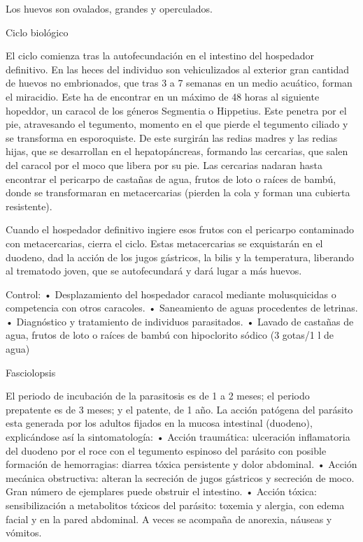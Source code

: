 Los huevos son ovalados, grandes y operculados.

Ciclo biológico

El ciclo comienza tras la autofecundación en el intestino del hospedador definitivo. En las heces del individuo son vehiculizados al exterior gran cantidad de huevos no embrionados, que tras 3 a 7 semanas en un medio acuático, forman el miracidio. Este ha de encontrar en un máximo de 48 horas al siguiente hopeddor, un caracol de los géneros Segmentia o Hippetius. Este penetra por el pie, atravesando el tegumento, momento en el que pierde el tegumento ciliado y se transforma en esporoquiste. De este surgirán las redias madres y las redias hijas, que se desarrollan en el hepatopáncreas, formando las cercarias, que salen del caracol por el moco que libera por su pie. Las cercarias nadaran hasta encontrar el pericarpo de castañas de agua, frutos de loto o raíces de bambú, donde se transformaran en metacercarias (pierden la cola y forman una cubierta resistente).

Cuando el hospedador definitivo ingiere esos frutos con el pericarpo contaminado con metacercarias, cierra el ciclo. Estas metacercarias se exquistarán en el duodeno, dad la acción de los jugos gástricos, la bilis y la temperatura, liberando al trematodo joven, que se autofecundará y dará lugar a más huevos.

Control:
• Desplazamiento del hospedador caracol mediante molusquicidas o competencia con otros caracoles.
• Saneamiento de aguas procedentes de letrinas.
• Diagnóstico y tratamiento de individuos parasitados.
• Lavado de castañas de agua, frutos de loto o raíces de bambú con hipoclorito sódico (3 gotas/1 l de agua)

Fasciolopsis

El periodo de incubación de la parasitosis es de 1 a 2 meses; el periodo prepatente es de 3 meses; y el patente, de 1 año. La acción patógena del parásito esta generada por los adultos fijados en la mucosa intestinal (duodeno), explicándose así la sintomatología:
• Acción traumática: ulceración inflamatoria del duodeno por el roce con el tegumento espinoso del parásito con posible formación de hemorragias: diarrea tóxica persistente y dolor abdominal.
• Acción mecánica obstructiva: alteran la secreción de jugos gástricos y secreción de moco. Gran número de ejemplares puede obstruir el intestino.
• Acción tóxica: sensibilización a metabolitos tóxicos del parásito: toxemia y alergia, con edema facial y en la pared abdominal.
A veces se acompaña de anorexia, náuseas y vómitos.

